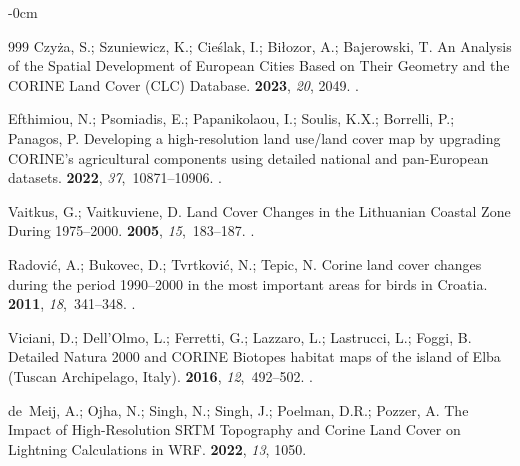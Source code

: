\documentclass[jimaging,article,accept,pdftex,oneauthor]{Definitions/mdpi}
\begin{document}
\begin{adjustwidth}{-\extralength}{0cm}
\begin{thebibliography}{999}
Czy{\.z}a, S.; Szuniewicz, K.; Cie{\'s}lak, I.; Bi{\l}ozor, A.; Bajerowski, T.
\newblock An Analysis of the Spatial Development of European Cities Based on
  Their Geometry and the CORINE Land Cover (CLC) Database.
 {\bf 2023}, {\em 20}, {2049}.
.

Efthimiou, N.; Psomiadis, E.; Papanikolaou, I.; Soulis, K.X.; Borrelli, P.;
  Panagos, P.
\newblock Developing a high-resolution land use/land cover map by upgrading
  CORINE's agricultural components using detailed national and pan-European
  datasets.
 {\bf 2022}, {\em 37},~10871--10906.
.

Vaitkus, G.; Vaitkuviene, D.
\newblock Land Cover Changes in the Lithuanian Coastal Zone During 1975–2000.
 {\bf 2005}, {\em 15},~183--187.
.

Radović, A.; Bukovec, D.; Tvrtković, N.; Tepic, N.
\newblock Corine land cover changes during the period 1990–2000 in the most
  important areas for birds in Croatia.
 {\bf 2011}, {\em 18},~341--348.
.

Viciani, D.; Dell'Olmo, L.; Ferretti, G.; Lazzaro, L.; Lastrucci, L.; Foggi, B.
\newblock Detailed Natura 2000 and CORINE Biotopes habitat maps of the island
  of Elba (Tuscan Archipelago, Italy).
 {\bf 2016}, {\em 12},~492--502.
.

de~Meij, A.; Ojha, N.; Singh, N.; Singh, J.; Poelman, D.R.; Pozzer, A.
\newblock The Impact of High-Resolution SRTM Topography and Corine Land Cover
  on Lightning Calculations in WRF.
 {\bf 2022}, {\em 13}, {1050}.


\end{thebibliography}
\end{adjustwidth}
\end{document}
